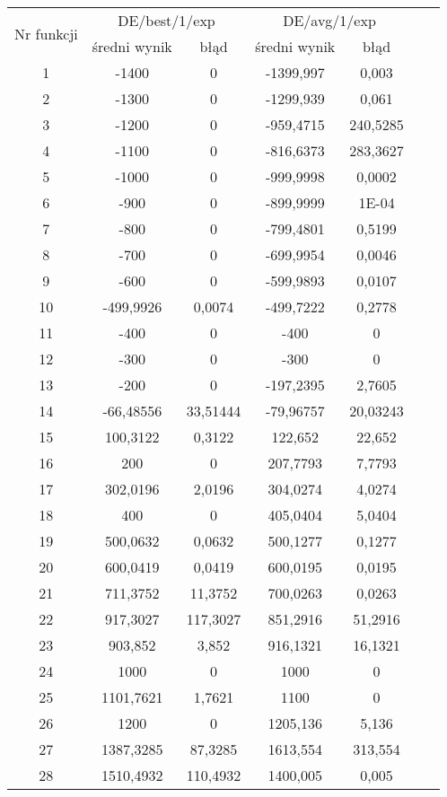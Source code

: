 \documentclass[a4paper,12pt]{article}
\theoremstyle{definition}
\begin{document}
\begin{table}[H]
\begin{tabular}{|c|c|c|c|c|c|c|}
	\hline
	\multirow{2}{*}{Nr funkcji} & \multicolumn{2}{c|}{DE/best/1/exp} & \multicolumn{2}{c|}{DE/avg/1/exp}\\
	\cline{2-5}
	& średni wynik & błąd & średni wynik & błąd\\\hline
	1     & -1400 & 0     & -1399,997 & 0,003 \\\hline
    2     & -1300 & 0     & -1299,939 & 0,061 \\\hline
    3     & -1200 & 0     & -959,4715 & 240,5285 \\\hline
    4     & -1100 & 0     & -816,6373 & 283,3627 \\\hline
    5     & -1000 & 0     & -999,9998 & 0,0002 \\\hline
    6     & -900  & 0     & -899,9999 & 1E-04 \\\hline
    7     & -800  & 0     & -799,4801 & 0,5199 \\\hline
    8     & -700  & 0     & -699,9954 & 0,0046 \\\hline
    9     & -600  & 0     & -599,9893 & 0,0107 \\\hline
    10    & -499,9926 & 0,0074 & -499,7222 & 0,2778 \\\hline
    11    & -400  & 0     & -400  & 0 \\\hline
    12    & -300  & 0     & -300  & 0 \\\hline
    13    & -200  & 0     & -197,2395 & 2,7605 \\\hline
    14    & -66,48556 & 33,51444 & -79,96757 & 20,03243 \\\hline
    15    & 100,3122 & 0,3122 & 122,652 & 22,652 \\\hline
    16    & 200   & 0     & 207,7793 & 7,7793 \\\hline
    17    & 302,0196 & 2,0196 & 304,0274 & 4,0274 \\\hline
    18    & 400   & 0     & 405,0404 & 5,0404 \\\hline
    19    & 500,0632 & 0,0632 & 500,1277 & 0,1277 \\\hline
    20    & 600,0419 & 0,0419 & 600,0195 & 0,0195 \\\hline
    21    & 711,3752 & 11,3752 & 700,0263 & 0,0263 \\\hline
    22    & 917,3027 & 117,3027 & 851,2916 & 51,2916 \\\hline
    23    & 903,852 & 3,852 & 916,1321 & 16,1321 \\\hline
    24    & 1000  & 0     & 1000  & 0 \\\hline
    25    & 1101,7621 & 1,7621 & 1100  & 0 \\\hline
    26    & 1200  & 0     & 1205,136 & 5,136 \\\hline
    27    & 1387,3285 & 87,3285 & 1613,554 & 313,554 \\\hline
    28    & 1510,4932 & 110,4932 & 1400,005 & 0,005 \\\hline
	\hline
\end{tabular}	
\end{table}
\end{document}

